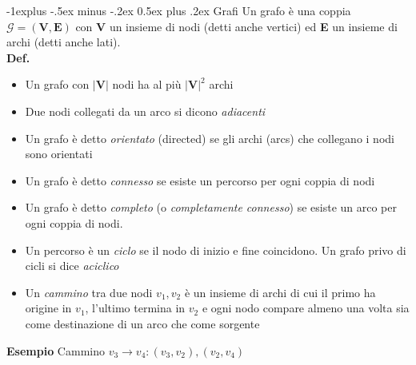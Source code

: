 \documentclass[10pt,landscape]{article}
\makeatletter
\renewcommand{\subsection}{\@startsection{subsection}{2}{0mm}%
                                {-1explus -.5ex minus -.2ex}%
                                {0.5ex plus .2ex}%
                                {\normalfont\large\bfseries}}
\makeatother
\begin{document}
\begin{multicols*}{4}
                \subsection{Grafi}
                Un grafo è una coppia $\mathcal{G} = (\textbf{V},\textbf{E})$ con \textbf{V} un insieme di nodi (detti anche vertici) ed \textbf{E} un insieme di archi (detti anche lati). \\ [3pt]
                \textbf{Def.} \\
                \begin{itemize}[left=0.7em, label=\raisebox{0.5ex}{\tiny$\bullet$}]
                        \item Un grafo con $|\textbf{V}|$ nodi ha al più $|\textbf{V}|^2$ archi
                        \item Due nodi collegati da un arco si dicono \textit{adiacenti}
                        \item Un grafo è detto \textit{orientato} (directed) se gli archi (arcs) che collegano i nodi sono orientati
                        \item Un grafo è detto \textit{connesso} se esiste un percorso per ogni coppia di nodi
                        \item Un grafo è detto \textit{completo} (o \textit{completamente connesso}) se esiste un arco per ogni coppia di nodi.
                        \item Un percorso è un \textit{ciclo} se il nodo di inizio e fine coincidono. Un grafo privo di cicli si dice \textit{aciclico}
                        \item Un \textit{cammino} tra due nodi $v_1,v_2$ è un insieme di archi di cui il primo ha origine in $v_1$, l’ultimo termina in $v_2$ e ogni nodo compare almeno una volta sia come destinazione di un arco che come sorgente
                \end{itemize}
                \textbf{Esempio} Cammino $v_3 \to v_4: (v_3,v_2), (v_2,v_4)$\\ [3pt]
                \begin{multicols}{2}
                        \begin{center}
\end{center}
\end{multicols}
\end{multicols*}
\end{document}
